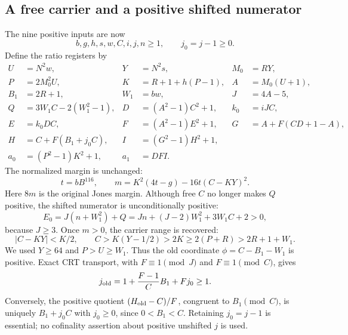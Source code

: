 \subsection{A free carrier and a positive shifted numerator}
The nine positive inputs are now
\[
 b,g,h,s,w,C,i,j,n\ge1,\qquad j_0=j-1\ge0.
\]
Define the ratio registers by
\begin{align*}
 U&=N^2w,&Y&=N^2s,&M_0&=RY,\\
 P&=2M_0^2U,&K&=R+1+h(P-1),&A&=M_0(U+1),\\
 B_1&=2R+1,&W_1&=bw,&J&=4A-5,\\
 Q&=3W_1C-2(W_1^2-1),&D&=(A^2-1)C^2+1,&k_0&=iJC,\\
 E&=k_0DC,&F&=(A^2-1)E^2+1,&G&=A+F(CD+1-A),\\
 H&=C+F(B_1+j_0C),&I&=(G^2-1)H^2+1,\\
 a_0&=(P^2-1)K^2+1,&a_1&=DFI.
\end{align*}
The normalized margin is unchanged:
\[
 t=bB^{116},\qquad m=K^2(4t-g)-16t(C-KY)^2.
\]
Here \(8m\) is the original Jones margin. Although free \(C\) no longer
makes \(Q\) positive, the shifted numerator is unconditionally positive:
\[
 E_0=J(n+W_1^2)+Q
 =Jn+(J-2)W_1^2+3W_1C+2>0,
\]
because \(J\ge3\). Once \(m>0\), the carrier range is recovered:
\[
 |C-KY|<K/2,\qquad
 C>K(Y-1/2)>2K\ge2(P+R)>2R+1+W_1.
\]
We used \(Y\ge64\) and \(P>U\ge W_1\). Thus the old coordinate
\(\phi=C-B_1-W_1\) is positive. Exact CRT transport, with
\(F\equiv1\pmod{J}\) and \(F\equiv1\pmod C\), gives
\[
 j_{\rm old}=1+\frac{F-1}{C}B_1+Fj_0\ge1.
\]
Conversely, the positive quotient \((H_{\rm old}-C)/F\), congruent to
\(B_1\pmod C\), is uniquely \(B_1+j_0C\) with \(j_0\ge0\), since
\(0<B_1<C\). Retaining \(j_0=j-1\) is essential; no cofinality
assertion about positive unshifted \(j\) is used.

